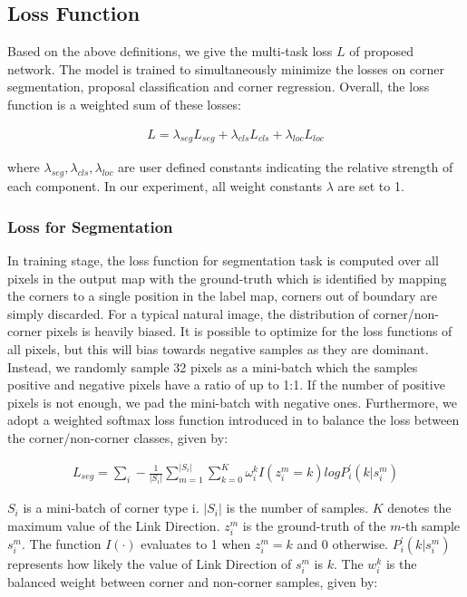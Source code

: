 \documentclass[3p, times]{elsarticle}
\begin{document}
\subsection{Loss Function}
Based on the above definitions, we give the multi-task loss $L$ of proposed network. The model is trained to simultaneously minimize the losses on corner segmentation, proposal classification and corner regression. Overall, the loss function is a weighted sum of these losses:

\begin{align}
L=\lambda_{seg}L_{seg}+\lambda_{cls}L_{cls}+\lambda_{loc}L_{loc}
\label{Eq:Loss_ALL}
\end{align}

\noindent where $\lambda_{seg}, \lambda_{cls}, \lambda_{loc}$ are user defined constants indicating the relative strength of each component. In our experiment, all weight constants $\lambda$ are set to 1.


\subsubsection{Loss for Segmentation}
In training stage, the loss function for segmentation task is computed over all pixels in the output map with the ground-truth which is identified by mapping the corners to a single position in the label map, corners out of boundary are simply discarded.  For a typical natural image, the distribution of corner/non-corner pixels is heavily biased. It is possible to optimize for the loss functions of all pixels, but this will bias towards negative samples as they are dominant. Instead, we randomly sample 32 pixels as a mini-batch which the samples positive and negative pixels have a ratio of up to 1:1. If the number of positive pixels is not enough, we pad the mini-batch with negative ones. Furthermore, we adopt a weighted softmax loss function introduced in \cite{FSDS2016CVPR} to balance the loss between the corner/non-corner classes, given by:

\begin{gather}
L_{seg}=\sum_{i}-\frac{1}{|S_i|}\sum_{m=1}^{|S_i|}\sum_{k=0}^{K}\omega_i^kI(z_i^m=k)logP_i^{'}(k|s_i^m)
\label{Eq:Loss_Seg}
\end{gather}

\noindent $S_i$ is a mini-batch of corner type i. $|S_i|$ is the number of samples. $K$ denotes the maximum value of the Link Direction. $z_i^m$ is the ground-truth of the $m$-th sample $s_i^m$. The function $I(\cdot)$ evaluates to 1 when $z_i^m=k$ and 0 otherwise. $P_i^{'}(k|s_i^m)$ represents how likely the value of Link Direction of $s_i^m$ is $k$. The $w_i^k$ is the balanced weight between corner and non-corner samples, given by:
\end{document}
